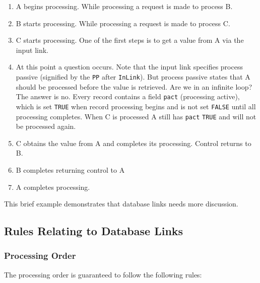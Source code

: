 \begin{enumerate}
\item A begins processing. While processing a request is made to process B.

\item B starts processing. While processing a request is made to process C.

\item C starts processing. One of the first steps is to get a value from A via the input link.

\item At this point a question occurs. Note that the input link specifies process passive (signified by the \verb|PP| after 
\verb|InLink|). But process passive states that A should be processed before the value is retrieved. Are we in an infinite 
loop? The answer is no. Every record contains a field \verb|pact| (processing active), which is set \verb|TRUE| when record 
processing begins and is not set \verb|FALSE| until all processing completes. When C is processed A still has \verb|pact| \verb|TRUE| 
and will not be processed again.

\item C obtains the value from A and completes its processing. Control returns to B.

\item B completes returning control to A

\item A completes processing.

\end{enumerate}

This brief example demonstrates that database links needs more discussion.

\subsection{Rules Relating to Database Links}

\subsubsection{Processing Order}

The processing order is guaranteed to follow the following rules:

